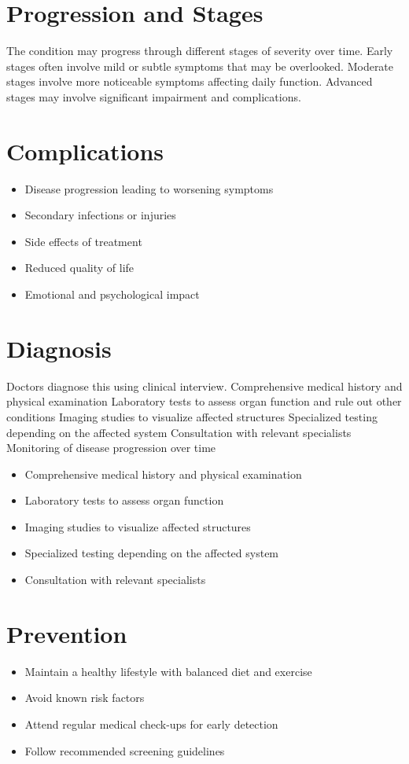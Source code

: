 \section{Progression and Stages}
The condition may progress through different stages of severity over time. Early stages often involve mild or subtle symptoms that may be overlooked. Moderate stages involve more noticeable symptoms affecting daily function. Advanced stages may involve significant impairment and complications.
\section{Complications}
\begin{itemize}[noitemsep]
  \item Disease progression leading to worsening symptoms
  \item Secondary infections or injuries
  \item Side effects of treatment
  \item Reduced quality of life
  \item Emotional and psychological impact
\end{itemize}
\section{Diagnosis}
Doctors diagnose this using clinical interview. Comprehensive medical history and physical examination Laboratory tests to assess organ function and rule out other conditions Imaging studies to visualize affected structures Specialized testing depending on the affected system Consultation with relevant specialists Monitoring of disease progression over time

\begin{itemize}[noitemsep]
  \item Comprehensive medical history and physical examination
  \item Laboratory tests to assess organ function
  \item Imaging studies to visualize affected structures
  \item Specialized testing depending on the affected system
  \item Consultation with relevant specialists
\end{itemize}
\section{Prevention}
\begin{itemize}[noitemsep]
  \item Maintain a healthy lifestyle with balanced diet and exercise
  \item Avoid known risk factors
  \item Attend regular medical check-ups for early detection
  \item Follow recommended screening guidelines
\end{itemize}
